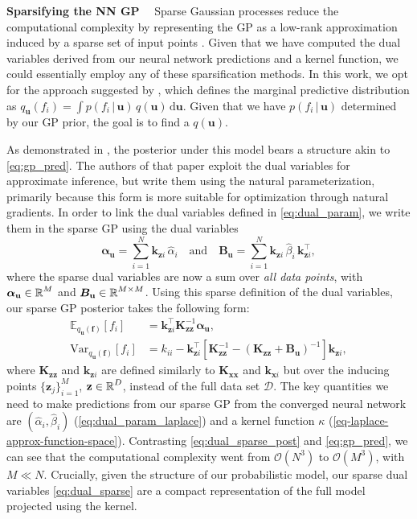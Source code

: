\documentclass{article}
\renewcommand{\paragraph}[1]{{\bf #1}~~}
\newcommand{\dataset}{\ensuremath{\mathcal{D}}}
\newcommand{\mathbold}[1]{\bm{#1}}
\newcommand{\mbf}[1]{\mathbf{#1}}
\renewcommand{\mid}{\,|\,}
\newcommand{\T}{\top}
\newcommand{\valpha}[0]{\mathbold{\alpha}}
\newcommand{\MBeta}[0]{\mathbold{B}}
\newcommand{\vz}{\mbf{z}}
\newcommand{\vf}{\mbf{f}}
\newcommand{\vu}{\mbf{u}}
\newcommand{\vx}{\mbf{x}}
\newcommand{\MKzz}{\mbf{K}_{\mbf{z}\mbf{z}}}
\newcommand{\MKxx}{\mbf{K}_{\mbf{x}\mbf{x}}}
\newcommand{\vkzi}{\mbf{k}_{\mbf{z}i}}
\newcommand{\vkzs}{\mbf{k}_{\mbf{z}i}}
\newcommand{\vk}{\mbf{k}}
\newcommand{\myexpect}{\mathbb{E}}
\begin{document}
\paragraph{Sparsifying the NN GP}
\label{sec:sparse-dual-gp}
%
Sparse Gaussian processes reduce the computational complexity by representing the GP as a low-rank approximation induced by a sparse set of input points \citep[see][for an early overview]{quinonero2005unifying}. Given that we have computed the dual variables derived from our neural network predictions and a kernel function, we could essentially employ any of these sparsification methods. In this work, we opt for the approach suggested by \citet{titsias2009variational} \citep[also used in the DTC approximation, see][]{quinonero2005unifying}, which defines the marginal predictive distribution as $q_{\vu}(f_i)  = \int p(f_i  \mid \vu) \, q(\vu) \, \mathrm{d}\vu$. Given that we have $p(f_i \mid \vu)$ determined by our GP prior, the goal is to find a $q(\vu)$.

As demonstrated in \citet{adam2021dual}, the posterior under this model bears a structure akin to \cref{eq:gp_pred}. The authors of that paper exploit the dual variables for approximate inference, but write them using the natural parameterization, primarily because this form is more suitable for optimization through natural gradients. In order to link the dual variables defined in \cref{eq:dual_param}, we write them in the sparse GP using the dual variables
%
\begin{equation} \textstyle
  \valpha_{\vu}  =  \sum_{i=1}^N  \vkzi \, \hat{\alpha}_{i}
  \quad \text{and} \quad
  \MBeta_{\vu} =  \sum_{i=1}^N \vkzi \,\hat{\beta}_{i} \, \vkzi^{\T} ,
\label{eq:dual_sparse}
\end{equation}
%
where the sparse dual variables are now a sum over \emph{all data points}, with $\valpha_{\vu} \in \R^{M}$ and $\MBeta_{\vu} \in \R^{M  \times M}$. Using this sparse definition of the dual variables, our sparse GP posterior takes the following form:
\begin{align}\label{eq:dual_sparse_post}
   \myexpect_{q_{\vu}(\vf)}[f_i] &= \vkzs^{\T} \MKzz^{-1} \valpha_{\vu}, \\
   \textrm{Var}_{q_{\vu}(\vf)}[f_i]  &= k_{ii} - \vkzs^\top [\MKzz^{-1} - (\MKzz + \MBeta_{\vu})^{-1} ]\vkzs, \nonumber
\end{align}
where $\MKzz$ and $\vkzs$ are defined similarly to $\MKxx$ and $\vk_{\vx i}$ but over the inducing points $\{\vz_j\}_{i=1}^M$, $\vz \in \R^{D}$, instead of the full data set $\dataset$. The key quantities we need to make predictions from our sparse GP from the converged neural network are $(\hat{\alpha}_i, \hat{\beta}_i)$ (\cref{eq:dual_param_laplace}) and a kernel function $\kappa$ (\cref{eq-laplace-approx-function-space}). Contrasting \cref{eq:dual_sparse_post} and \cref{eq:gp_pred}, we can see that the computational complexity went from $\mathcal{O}(N^3)$ to $\mathcal{O}(M^3)$, with $M \ll N$.  Crucially, given the structure of our probabilistic model, our sparse dual variables \cref{eq:dual_sparse} are a compact representation of the full model projected using the kernel.
\end{document}
